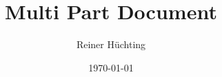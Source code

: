 \documentclass{beamer}
\title{Multi Part Document}
\author{Reiner Hüchting}
\date{\today}
\begin{document}
\begin{frame}
\maketitle
\end{frame}
\end{document}
